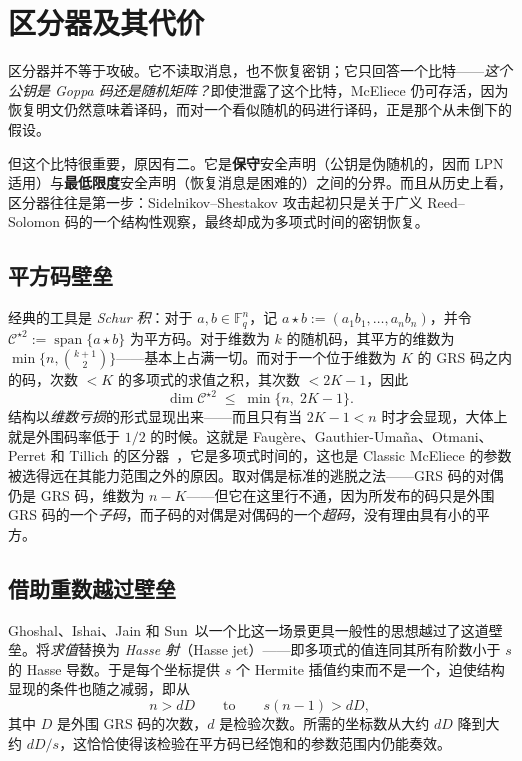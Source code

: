 \section{区分器及其代价}
\label{sec:goppa-distinguishers}

区分器并不等于攻破。它不读取消息，也不恢复密钥；它只回答一个比特——\emph{这个公钥是 Goppa 码还是随机矩阵？}即使泄露了这个比特，McEliece 仍可存活，因为恢复明文仍然意味着译码，而对一个看似随机的码进行译码，正是那个从未倒下的假设。

但这个比特很重要，原因有二。它是\textbf{保守}安全声明（公钥是伪随机的，因而 LPN 适用）与\textbf{最低限度}安全声明（恢复消息是困难的）之间的分界。而且从历史上看，区分器往往是第一步：Sidelnikov--Shestakov 攻击起初只是关于广义 Reed--Solomon 码的一个结构性观察，最终却成为多项式时间的密钥恢复。

\subsection{平方码壁垒}

经典的工具是 \emph{Schur 积}：对于 $a,b \in \mathbb{F}_q^n$，记 $a \star b := (a_1b_1,\dots,a_nb_n)$，并令 $\mathcal{C}^{\star 2} := \operatorname{span}\{a\star b\}$ 为平方码。对于维数为 $k$ 的随机码，其平方的维数为 $\min\{n,\binom{k+1}{2}\}$——基本上占满一切。而对于一个位于维数为 $K$ 的 GRS 码之内的码，次数 $<K$ 的多项式的求值之积，其次数 $<2K-1$，因此
\[
\dim \mathcal{C}^{\star 2} \;\le\; \min\{n,\; 2K-1\}.
\]
结构以\emph{维数亏损}的形式显现出来——而且只有当 $2K-1 < n$ 时才会显现，大体上就是外围码率低于 $1/2$ 的时候。这就是 Faug\`{e}re、Gauthier-Uma\~{n}a、Otmani、Perret 和 Tillich 的区分器~\cite{fgopt2013}，它是多项式时间的，这也是 Classic McEliece 的参数被选得远在其能力范围之外的原因。取对偶是标准的逃脱之法——GRS 码的对偶仍是 GRS 码，维数为 $n-K$——但它在这里行不通，因为所发布的码只是外围 GRS 码的一个\emph{子码}，而子码的对偶是对偶码的一个\emph{超码}，没有理由具有小的平方。

\subsection{借助重数越过壁垒}

Ghoshal、Ishai、Jain 和 Sun~\cite{gijs2026}以一个比这一场景更具一般性的思想越过了这道壁垒。将\emph{求值}替换为 \emph{Hasse 射}（Hasse jet）——即多项式的值连同其所有阶数小于 $s$ 的 Hasse 导数。于是每个坐标提供 $s$ 个 Hermite 插值约束而不是一个，迫使结构显现的条件也随之减弱，即从
\[
n > dD
\qquad\text{to}\qquad
s(n-1) > dD ,
\]
其中 $D$ 是外围 GRS 码的次数，$d$ 是检验次数。所需的坐标数从大约 $dD$ 降到大约 $dD/s$，这恰恰使得该检验在平方码已经饱和的参数范围内仍能奏效。

